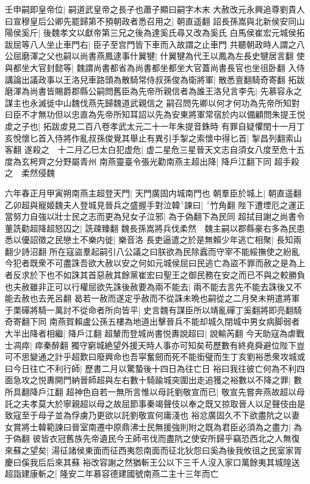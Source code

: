 壬申嗣即皇帝位|{
	嗣道武皇帝之長子也蕭子顯曰嗣字木末}
大赦改元永興追尊劉貴人曰宣穆皇后公卿先罷歸第不預朝政者悉召用之|{
	朝直遥翻}
詔長孫嵩與北新侯安同山陽侯奚斤|{
	後魏孝文以獻帝第三兄之後為達奚氏尋又改為奚氏}
白馬侯崔宏元城侯拓跋屈等八人坐止車門右|{
	臣子至宫門皆下車而入故謂之止車門}
共聽朝政時人謂之八公屈磨渾之父也嗣以尚書燕鳳逮事什翼犍|{
	什翼犍為代王以鳳為左長史犍居言翻}
使與都坐大官封懿等|{
	魏謂尚書都省為尚書都坐都坐大官蓋尚書長官也坐徂卧翻}
入侍講論出議政事以王洛兒車路頭為散騎常侍叔孫俊為衛將軍|{
	散悉亶翻騎奇寄翻}
拓跋磨渾為尚書皆賜爵郡縣公嗣問舊臣為先帝所親信者為誰王洛兒言李先|{
	先慕容永之謀主也永滅徙中山魏伐燕先歸魏道武親信之}
嗣召問先卿以何才何功為先帝所知對曰臣不才無功但以忠直為先帝所知耳詔以先為安東將軍常宿於内以備顧問朱提王悦䖍之子也|{
	拓跋䖍見二百八卷孝武太元二十一年朱提音銖時}
有罪自疑懼閏十一月丁亥悅懷匕首入侍將作亂叔孫俊覺其舉止有異引手掣之索懷中得匕首|{
	掣昌列翻索山客翻}
遂殺之　十二月乙巳太白犯虚危|{
	虚二星危三星晉天文志自須女八度至危十五度為玄枵齊之分野屬青州}
南燕靈臺令張光勸南燕主超出降|{
	降戶江翻下同}
超手殺之　柔然侵魏

六年春正月甲寅朔南燕主超登天門|{
	天門廣固内城南門也}
朝羣臣於城上|{
	朝直遥翻}
乙卯超與寵姬魏夫人登城見晉兵之盛握手對泣韓諫曰|{
	竹角翻}
陛下遭堙厄之運正當努力自強以壯士民之志而更為兒女子泣邪|{
	為于偽翻下為民同}
超拭目謝之尚書令董詵勸超降超怒囚之|{
	詵疎臻翻}
魏長孫嵩將兵伐柔然　魏主嗣以郡縣豪右多為民患悉以優詔徵之民戀土不樂内徙|{
	樂音洛}
長吏逼遣之於是無賴少年逃亡相聚|{
	長知兩翻少詩沼翻}
所在寇盜羣起嗣引八公議之曰朕欲為民除蠧而守宰不能綏撫使之紛亂今犯者既衆不可盡誅吾欲大赦以安之何如元城侯屈曰民逃亡為盜不罪而赦之是為上者反求於下也不如誅其首惡赦其餘黨崔宏曰聖王之御民務在安之而已不與之較勝負也夫赦雖非正可以行權屈欲先誅後赦要為兩不能去|{
	兩不能去言先不能去誅後又不能去赦也去羌呂翻}
曷若一赦而遂定乎赦而不從誅未晩也嗣從之二月癸未朔遣將軍于栗磾將騎一萬討不從命者所向皆平|{
	史言魏有謀臣所以靖亂磾丁奚翻將即亮翻騎奇寄翻下同}
南燕賀賴盧公孫五樓為地道出擊晉兵不能却城久閉城中男女病脚弱者大半出降者相繼|{
	降戶江翻}
超輦而登城尚書悦夀說超曰|{
	說輸芮翻}
今天助寇為虐戰士凋瘁|{
	瘁秦醉翻}
獨守窮城絶望外援天時人事亦可知矣苟歷數有終堯舜避位陛下豈可不思變通之計乎超歎曰廢興命也吾寜奮劒而死不能銜璧而生丁亥劉裕悉衆攻城或曰今日往亡不利行師|{
	歷書二月以驚蟄後十四日為往亡日}
裕曰我往彼亡何為不利四面急攻之悦夀開門納晉師超與左右數十騎踰城突圍出走追獲之裕數以不降之罪|{
	數所具翻降戶江翻}
超神色自若一無所言惟以母託劉敬宣而已|{
	敬宣先嘗奔燕故超以母託之夫孝莫大於寧親超以母之故屈節事秦竭聲伎以奉之既又掠取晉人以足聲伎由是致寇至于母子並為俘虜乃更欲以託劉敬宣何庸淺也}
裕忿廣固久不下欲盡阬之以妻女賞將士韓範諫曰晉室南遷中原鼎沸士民無援強則附之既為君臣必須為之盡力|{
	為于偽翻}
彼皆衣冠舊族先帝遺民今王師弔伐而盡阬之使安所歸乎竊恐西北之人無復來蘇之望矣|{
	湯征諸侯東面而征西夷怨南面而征北狄怨曰奚為後我攸徂之民室家胥慶曰傒我后后來其蘇}
裕改容謝之然猶斬王公以下三千人沒入家口萬餘夷其城隍送超詣建康斬之|{
	隆安二年慕容德建國號南燕二主十三年而亡}


